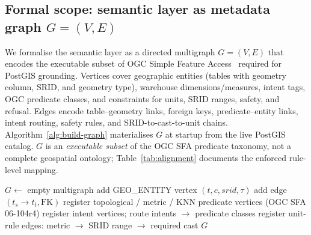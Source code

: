 
\subsection{Formal scope: semantic layer as metadata graph \texorpdfstring{$G=(V,E)$}{G=(V,E)}}
\label{sec:formal-scope}

We formalise the semantic layer as a directed multigraph $G=(V,E)$ that encodes the executable subset of OGC Simple Feature Access~\citep{ogcsfs} required for PostGIS grounding. Vertices cover geographic entities (tables with geometry column, SRID, and geometry type), warehouse dimensions/measures, intent tags, OGC predicate classes, and constraints for units, SRID ranges, safety, and refusal. Edges encode table--geometry links, foreign keys, predicate--entity links, intent routing, safety rules, and SRID-to-cast-to-unit chains. Algorithm~\ref{alg:build-graph} materialises $G$ at startup from the live PostGIS catalog. $G$ is an \emph{executable subset} of the OGC SFA predicate taxonomy, not a complete geospatial ontology; Table~\ref{tab:alignment} documents the enforced rule-level mapping.

\begin{algorithm}[t]
\caption{\textsc{BuildSemanticGraph}($\mathit{schema}, \mathit{prefix}$)}
\label{alg:build-graph}
\begin{algorithmic}[1]
\STATE $G \gets$ empty multigraph
    \STATE add GEO\_ENTITY vertex $(t, c, \mathit{srid}, \tau)$
  \ENDIF
\ENDFOR
{}
  \STATE add edge $(t_s \to t_t, \text{FK})$
\ENDFOR
\STATE register topological / metric / KNN predicate vertices (OGC SFA 06-104r4)
\STATE register intent vertices; route intents $\to$ predicate classes
\STATE register unit-rule edges: metric $\to$ SRID range $\to$ required cast
\RETURN $G$
\end{algorithmic}
\end{algorithm}

